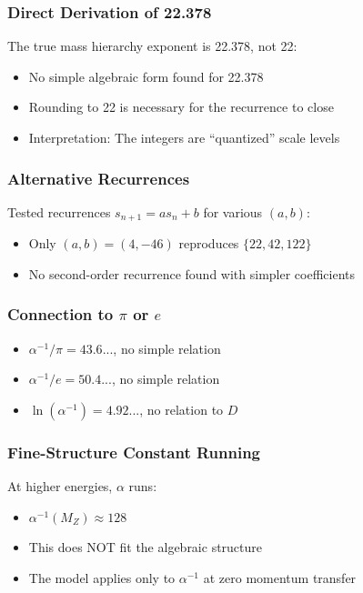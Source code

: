 \documentclass[12pt,a4paper]{article}
\begin{document}
\subsubsection{Direct Derivation of 22.378}

The true mass hierarchy exponent is 22.378, not 22:
\begin{itemize}
\item No simple algebraic form found for 22.378
\item Rounding to 22 is necessary for the recurrence to close
\item Interpretation: The integers are ``quantized'' scale levels
\end{itemize}

\subsubsection{Alternative Recurrences}

Tested recurrences $s_{n+1} = as_n + b$ for various $(a,b)$:
\begin{itemize}
\item Only $(a,b) = (4, -46)$ reproduces $\{22, 42, 122\}$
\item No second-order recurrence found with simpler coefficients
\end{itemize}

\subsubsection{Connection to $\pi$ or $e$}

\begin{itemize}
\item $\alpha^{-1}/\pi = 43.6...$, no simple relation
\item $\alpha^{-1}/e = 50.4...$, no simple relation
\item $\ln(\alpha^{-1}) = 4.92...$, no relation to $D$
\end{itemize}

\subsubsection{Fine-Structure Constant Running}

At higher energies, $\alpha$ runs:
\begin{itemize}
\item $\alpha^{-1}(M_Z) \approx 128$
\item This does NOT fit the algebraic structure
\item The model applies only to $\alpha^{-1}$ at zero momentum transfer
\end{itemize}
\end{document}
